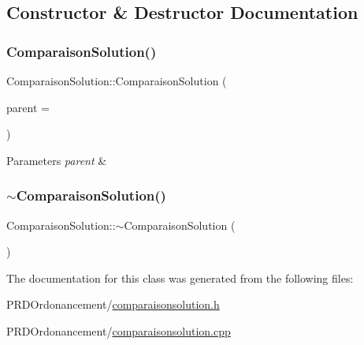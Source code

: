 \subsection{Constructor \& Destructor Documentation}
\mbox{\label{classComparaisonSolution_a7fc9723f5a627d53e331719c3f47c7cc}} 
\subsubsection{\texorpdfstring{Comparaison\+Solution()}{ComparaisonSolution()}}
{\footnotesize\ttfamily Comparaison\+Solution\+::\+Comparaison\+Solution (\begin{DoxyParamCaption}\item[{Q\+Widget $\ast$}]{parent = {} }\end{DoxyParamCaption})\hspace{0.3cm}{\ttfamily [explicit]}}


\begin{DoxyParams}{Parameters}
{\em parent} & \\
\hline
\end{DoxyParams}
\mbox{\label{classComparaisonSolution_a07a910b473173981273789934cf34e7f}} 
\subsubsection{\texorpdfstring{$\sim$\+Comparaison\+Solution()}{~ComparaisonSolution()}}
{\footnotesize\ttfamily Comparaison\+Solution\+::$\sim$\+Comparaison\+Solution (\begin{DoxyParamCaption}{ }\end{DoxyParamCaption})}



The documentation for this class was generated from the following files\+:\begin{DoxyCompactItemize}
\item 
P\+R\+D\+Ordonancement/\hyperlink{comparaisonsolution_8h}{comparaisonsolution.\+h}\item 
P\+R\+D\+Ordonancement/\hyperlink{comparaisonsolution_8cpp}{comparaisonsolution.\+cpp}\end{DoxyCompactItemize}
